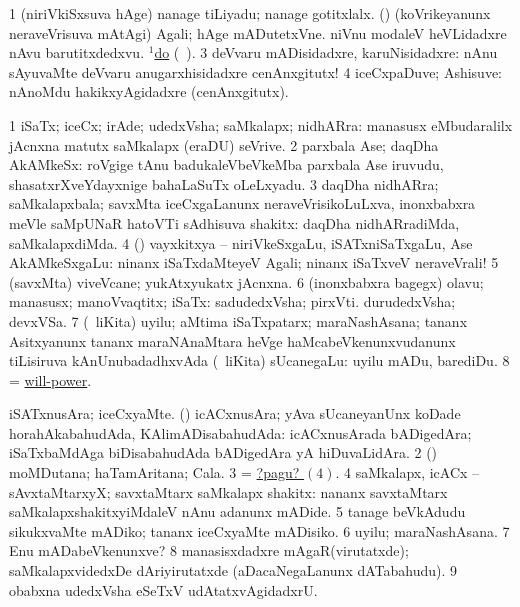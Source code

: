 \noindent
\gl{\pagu}
\expl{}
\bmng
\bnum
\num{1}  (niriVkiSxsuva hAge) nanage tiLiyadu; nanage gotitxlalx. 
  (\AmA) 
\banum
{} (koVrikeyanunx neraveVrisuva mAtAgi) Agali; hAge mADutetxVne.  niVnu modaleV heVLidadxre nAvu barutitxdedxvu. 
  \hyperref{kandict_d.pdf}{D}{do(1) nuga(34)}{$^1$do} (\pagu\ ). 
\eanum
\numie
\num{3}  deVvaru mADisidadxre, karuNisidadxre:  nAnu sAyuvaMte deVvaru anugarxhisidadxre cenAnxgitutx! 
\num{4}  iceCxpaDuve; Ashisuve:  nAnoMdu hakikxyAgidadxre (cenAnxgitutx). 
\enum
\emng
\eentry

\bentry
{} 
\gl{\nA}
\bmng
\bnum
\num{1} iSaTx; iceCx; irAde; udedxVsha; saMkalapx; nidhARra:  manasusx eMbudaralilx jAcnxna matutx saMkalapx (eraDU) seVrive. 
\num{2} parxbala Ase; daqDha AkAMkeSx:  roVgige tAnu badukaleVbeVkeMba parxbala Ase iruvudu, shasatxrXveYdayxnige bahaLaSuTx oLeLxyadu. 
\num{3} daqDha nidhARra; saMkalapxbala; savxMta iceCxgaLanunx neraveVrisikoLuLxva, inonxbabxra meVle saMpUNaR hatoVTi sAdhisuva shakitx:  daqDha nidhARradiMda, saMkalapxdiMda. 
\num{4} (\pArxparx) vayxkitxya -- niriVkeSxgaLu, iSATxniSaTxgaLu, Ase AkAMkeSxgaLu:  ninanx iSaTxdaMteyeV Agali; ninanx iSaTxveV neraveVrali! 
\num{5} (savxMta) viveVcane; yukAtxyukatx jAcnxna. 
\num{6} (inonxbabxra bagegx) olavu; manasusx; manoVvaqtitx; iSaTx:  sadudedxVsha; pirxVti.  durudedxVsha; devxVSa. 
\num{7} (\sA\ liKita) uyilu; aMtima iSaTxpatarx; maraNashAsana; tananx Asitxyanunx tananx maraNAnaMtara heVge haMcabeVkenunxvudanunx tiLisiruva kAnUnubadadhxvAda (\sA\ liKita) sUcanegaLu:  uyilu mADu, barediDu. 
\num{8} = \hyperlink{will-power}{will-power}. 
\enum
\emng

\noindent
\gl{\pagu}
\bmng
\bnum
{}  
\banum
{} iSATxnusAra; iceCxyaMte. 
 (\nAyxshA) icACxnusAra; yAva sUcaneyanUnx koDade horahAkabahudAda, KAlimADisabahudAda:  icACxnusArada bADigedAra; iSaTxbaMdAga biDisabahudAda bADigedAra yA hiDuvaLidAra. 
\eanum
\numie
\num{2}  (\sw) moMDutana; haTamAritana; Cala. 
\num{3}  = \hyperlink{will pagu4}{?pagu? \((4)\)}. 
\hypertarget{will pagu4}{} 
\num{4}  saMkalapx, icACx -- sAvxtaMtarxyX; savxtaMtarx saMkalapx shakitx:  nananx savxtaMtarx saMkalapxshakitxyiMdaleV nAnu adanunx mADide. 
\num{5}  tanage beVkAdudu sikukxvaMte mADiko; tananx iceCxyaMte mADisiko. 
\num{6}  uyilu; maraNashAsana. 
\num{7}  Enu mADabeVkenunxve? 
\num{8}  manasisxdadxre mAgaR(virutatxde); saMkalapxvidedxDe dAriyirutatxde (aDacaNegaLanunx dATabahudu). 
\num{9}  obabxna udedxVsha eSeTxV udAtatxvAgidadxrU. 
\enum
\emng
\eentry

